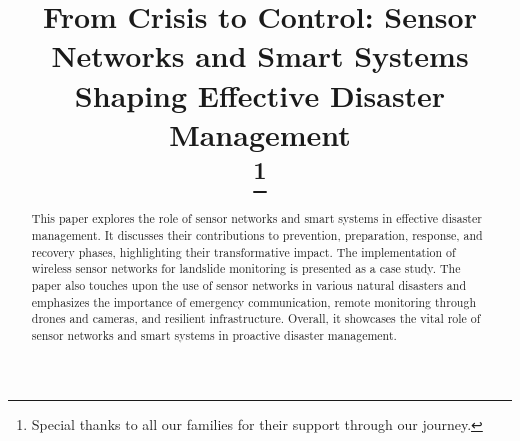 \documentclass[conference]{IEEEtran}
\begin{document}
\title{From Crisis to Control: Sensor Networks and Smart Systems Shaping Effective Disaster Management \\
	\thanks{Special thanks to all our families for their support through our journey.}
}

\author{
}

\maketitle

\begin{abstract}
	This paper explores the role of sensor networks and smart systems in effective disaster management. 
	It discusses their contributions to prevention, preparation, response, and recovery phases, highlighting 
	their transformative impact. The implementation of wireless sensor networks for landslide monitoring is 
	presented as a case study. The paper also touches upon the use of sensor networks in various natural 
	disasters and emphasizes the importance of emergency communication, remote monitoring through drones 
	and cameras, and resilient infrastructure. Overall, it showcases the vital role of sensor networks and 
	smart systems in proactive disaster management.\par
\end{abstract}
\end{document}
